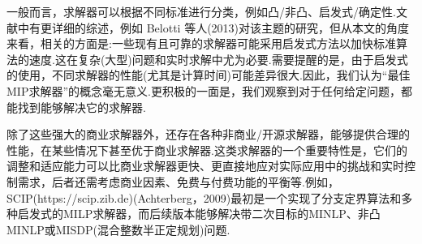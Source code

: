 \documentclass[10pt]{article}
\begin{document}
\begin{table}[h]
  \centering
  \caption{MIP实现软件示例.}
\end{table}


一般而言，求解器可以根据不同标准进行分类，例如凸/非凸、启发式/确定性.文献中有更详细的综述，例如 Belotti 等人(2013)对该主题的研究，但从本文的角度来看，相关的方面是:一些现有且可靠的求解器可能采用启发式方法以加快标准算法的速度.这在复杂(大型)问题和实时求解中尤为必要.需要提醒的是，由于启发式的使用，不同求解器的性能(尤其是计算时间)可能差异很大.因此，我们认为“最佳MIP求解器”的概念毫无意义.更积极的一面是，我们观察到对于任何给定问题，都能找到能够解决它的求解器.

除了这些强大的商业求解器外，还存在各种非商业/开源求解器，能够提供合理的性能，在某些情况下甚至优于商业求解器.这类求解器的一个重要特性是，它们的调整和适应能力可以比商业求解器更快、更直接地应对实际应用中的挑战和实时控制需求，后者还需考虑商业因素、免费与付费功能的平衡等.例如，SCIP(https://scip.zib.de)(Achterberg，2009)最初是一个实现了分支定界算法和多种启发式的MILP求解器，而后续版本能够解决带二次目标的MINLP、非凸MINLP或MISDP(混合整数半正定规划)问题.
\end{document}
